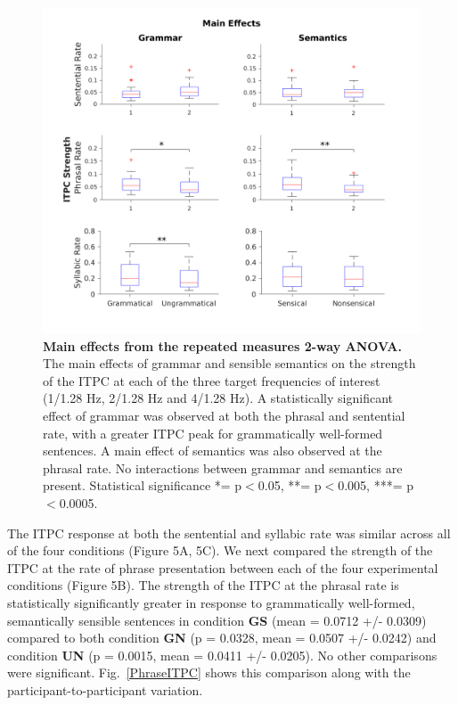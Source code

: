 \documentclass[10pt,letterpaper]{article}
\begin{document}

\begin{figure}[tbhp]
\includegraphics[width=\linewidth]{BoxPlots_main_effects.png}
\caption{\textbf{Main effects from the repeated measures 2-way ANOVA.} The main effects of grammar and sensible semantics on the strength of the ITPC at each of the three target frequencies of interest (1/1.28 Hz, 2/1.28 Hz and 4/1.28 Hz). A statistically significant effect of grammar was observed at both the phrasal and sentential rate, with a greater ITPC peak for grammatically well-formed sentences. A main effect of semantics was also observed at the phrasal rate. No interactions between grammar and semantics are present. Statistical significance *= p$<$0.05, **= p$<$0.005, ***= p$<$0.0005.}
\label{MainEffects}
\end{figure}

The ITPC response at both the sentential and syllabic rate was similar across all of the four conditions (Figure 5A, 5C). We next compared the strength of the ITPC at the rate of phrase presentation between each of the four experimental conditions (Figure 5B). The strength of the ITPC at the phrasal rate is statistically significantly greater in response to grammatically well-formed, semantically sensible sentences in  condition \textbf{GS} (mean = 0.0712 +/- 0.0309) compared to both condition \textbf{GN} (p = 0.0328, mean = 0.0507 +/- 0.0242) and condition \textbf{UN} (p = 0.0015, mean = 0.0411 +/- 0.0205). No other comparisons were significant. Fig.~\ref{PhraseITPC} shows this comparison along with the participant-to-participant variation.
\end{document}
